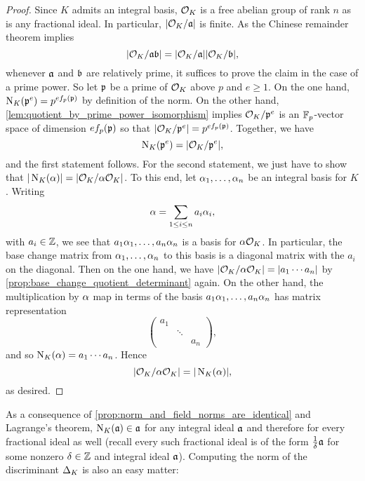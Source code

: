     \begin{proof}
      Since $K$ admits an integral basis, $\mathcal{O}_{K}$ is a free abelian group of rank $n$ as is any fractional ideal. In particular, $|\mathcal{O}_{K}/\mathfrak{a}|$ is finite. As the Chinese remainder theorem implies
      \[
        |\mathcal{O}_{K}/\mathfrak{a}\mathfrak{b}| = |\mathcal{O}_{K}/\mathfrak{a}||\mathcal{O}_{K}/\mathfrak{b}|,
      \]
      whenever $\mathfrak{a}$ and $\mathfrak{b}$ are relatively prime, it suffices to prove the claim in the case of a prime power. So let $\mathfrak{p}$ be a prime of $\mathcal{O}_{K}$ above $p$ and $e \ge 1$. On the one hand, $\operatorname{\mathrm{N}}_{K}(\mathfrak{p}^{e}) = p^{ef_{p}(\mathfrak{p})}$ by definition of the norm. On the other hand, \cref{lem:quotient_by_prime_power_isomorphism} implies $\mathcal{O}_{K}/\mathfrak{p}^{e}$ is an $\mathbb{F}_{p}$-vector space of dimension $ef_{p}(\mathfrak{p})$ so that $|\mathcal{O}_{K}/\mathfrak{p}^{e}| = p^{ef_{p}(\mathfrak{p})}$. Together, we have
      \[
        \operatorname{\mathrm{N}}_{K}(\mathfrak{p}^{e}) = |\mathcal{O}_{K}/\mathfrak{p}^{e}|,
      \]
      and the first statement follows. For the second statement, we just have to show that $|\operatorname{\mathrm{N}}_{K}(\alpha)| = |\mathcal{O}_{K}/\alpha\mathcal{O}_{K}|$. To this end, let $\alpha_{1},\ldots,\alpha_{n}$ be an integral basis for $K$. Writing
      \[
        \alpha = \sum_{1 \le i \le n}a_{i}\alpha_{i},
      \]
      with $a_{i} \in \mathbb{Z}$, we see that $a_{1}\alpha_{1},\ldots,a_{n}\alpha_{n}$ is a basis for $\alpha\mathcal{O}_{K}$. In particular, the base change matrix from $\alpha_{1},\ldots,\alpha_{n}$  to this basis is a diagonal matrix with the $a_{i}$ on the diagonal. Then on the one hand, we have $|\mathcal{O}_{K}/\alpha\mathcal{O}_{K}| = |a_{1} \cdots a_{n}|$ by \cref{prop:base_change_quotient_determinant} again. On the other hand, the multiplication by $\alpha$ map in terms of the basis $a_{1}\alpha_{1},\ldots,a_{n}\alpha_{n}$ has matrix representation
      \[
        \begin{pmatrix} a_{1} & & \\ & \ddots & \\ & & a_{n} \end{pmatrix},
      \]
      and so $\operatorname{\mathrm{N}}_{K}(\alpha) = a_{1} \cdots a_{n}$. Hence
      \[
        |\mathcal{O}_{K}/\alpha\mathcal{O}_{K}| = |\operatorname{\mathrm{N}}_{K}(\alpha)|,
      \]
      as desired.
    \end{proof}

    As a consequence of \cref{prop:norm_and_field_norms_are_identical} and Lagrange's theorem, $\operatorname{\mathrm{N}}_{K}(\mathfrak{a}) \in \mathfrak{a}$ for any integral ideal $\mathfrak{a}$ and therefore for every fractional ideal as well (recall every such fractional ideal is of the form $\frac{1}{\delta}\mathfrak{a}$ for some nonzero $\delta \in \mathbb{Z}$ and integral ideal $\mathfrak{a}$). Computing the norm of the discriminant $\Delta_{K}$ is also an easy matter:

